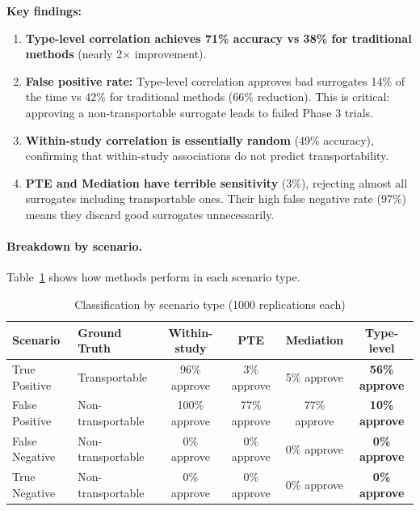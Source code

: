 \textbf{Key findings:}
\begin{enumerate}
    \item \textbf{Type-level correlation achieves 71\% accuracy vs 38\% for traditional methods} (nearly 2$\times$ improvement).

    \item \textbf{False positive rate:} Type-level correlation approves bad surrogates 14\% of the time vs 42\% for traditional methods (66\% reduction). This is critical: approving a non-transportable surrogate leads to failed Phase 3 trials.

    \item \textbf{Within-study correlation is essentially random} (49\% accuracy), confirming that within-study associations do not predict transportability.

    \item \textbf{PTE and Mediation have terrible sensitivity} (3\%), rejecting almost all surrogates including transportable ones. Their high false negative rate (97\%) means they discard good surrogates unnecessarily.
\end{enumerate}

\paragraph{Breakdown by scenario.} Table~\ref{tab:by-scenario} shows how methods perform in each scenario type.

\begin{table}[h]
\centering
\caption{Classification by scenario type (1000 replications each)}
\label{tab:by-scenario}
\begin{tabular}{llcccc}
\toprule
Scenario & Ground Truth & Within-study & PTE & Mediation & Type-level \\
\midrule
True Positive & Transportable & 96\% approve & 3\% approve & 5\% approve & \textbf{56\% approve} \\
False Positive & Non-transportable & 100\% approve & 77\% approve & 77\% approve & \textbf{10\% approve} \\
False Negative & Non-transportable & 0\% approve & 0\% approve & 0\% approve & \textbf{0\% approve} \\
True Negative & Non-transportable & 0\% approve & 0\% approve & 0\% approve & \textbf{0\% approve} \\
\bottomrule
\end{tabular}
\end{table}

